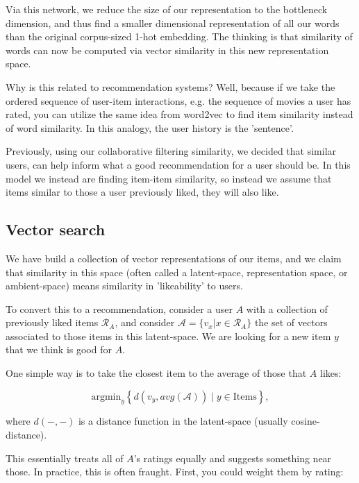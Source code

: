 Via this network, we reduce the size of our representation to the bottleneck dimension, and thus find a smaller dimensional representation of all our words than the original corpus-sized 1-hot embedding. The thinking is that similarity of words can now be computed via vector similarity in this new representation space. 

Why is this related to recommendation systems? Well, because if we take the ordered sequence of user-item interactions, e.g. the sequence of movies a user has rated, you can utilize the same idea from word2vec to find item similarity instead of word similarity. In this analogy, the user history is the 'sentence'.

Previously, using our collaborative filtering similarity, we decided that similar users, can help inform what a good recommendation for a user should be. In this model we instead are finding item-item similarity, so instead we assume that items similar to those a user previously liked, they will also like. 

\subsection{Vector search}

We have build a collection of vector representations of our items, and we claim that similarity in this space (often called a latent-space, representation space, or ambient-space) means similarity in 'likeability' to users.

To convert this to a recommendation, consider a user $A$ with a collection of previously liked items $\mathcal{R}_A$, and consider $\mathcal{A}=\lbrace v_x | x\in \mathcal{R}_A\rbrace$ the set of vectors associated to those items in this latent-space. We are looking for a new item $y$ that we think is good for $A$.

One simple way is to take the closest item to the average of those that $A$ likes:

\begin{equation}
	\textrm{argmin}_y\left\lbrace d(v_y,avg(\mathcal{A}))\mid y\in \textrm{Items}\right\rbrace,
\end{equation}

where $d(-,-)$ is a distance function in the latent-space (usually cosine-distance).

This essentially treats all of $A$'s ratings equally and suggests something near those. In practice, this is often fraught. First, you could weight them by rating:


